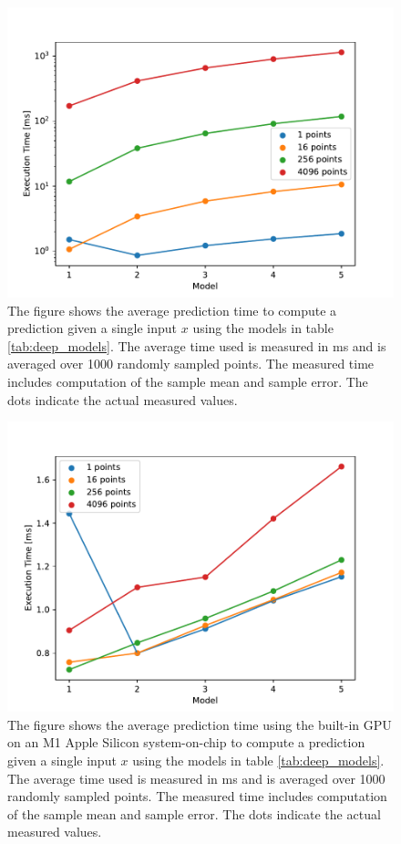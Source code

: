 \begin{figure}[h!]
    \centering
    \includegraphics[scale=0.7]{figures/prediction_time/prediction_time.pdf}
    \caption{The figure shows the average prediction time to compute a prediction given a single input $x$ using the models in table \ref{tab:deep_models}. The average time used is measured in ms and is averaged over 1000 randomly sampled points. The measured time includes computation of the sample mean and sample error. The dots indicate the actual measured values.
    }
    \label{fig:prediction_time}
\end{figure}

\begin{figure}[h!]
    \centering
    \includegraphics[scale=0.7]{figures/prediction_time/prediction_time_gpu.pdf}
    \caption{The figure shows the average prediction time using the built-in GPU on an M1 Apple Silicon system-on-chip to compute a prediction given a single input $x$ using the models in table \ref{tab:deep_models}. The average time used is measured in ms and is averaged over 1000 randomly sampled points. The measured time includes computation of the sample mean and sample error. The dots indicate the actual measured values.
    }
    \label{fig:prediction_time_gpu}
\end{figure}

